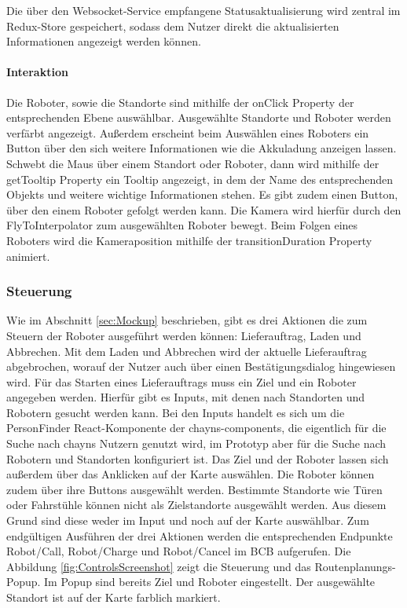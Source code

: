 Die über den \gls{Websocket}-Service empfangene Statusaktualisierung wird zentral im Redux-Store gespeichert, sodass dem Nutzer direkt die aktualisierten Informationen angezeigt werden können.

\paragraph{Interaktion}
Die Roboter, sowie die Standorte sind mithilfe der onClick Property der entsprechenden Ebene \cite{DeckglInteractivity} auswählbar. Ausgewählte Standorte und Roboter werden verfärbt angezeigt. Außerdem erscheint beim Auswählen eines Roboters ein Button über den sich weitere Informationen wie die Akkuladung anzeigen lassen. Schwebt die Maus über einem Standort oder Roboter, dann wird mithilfe der getTooltip Property \cite{DeckglDeckClass} ein Tooltip angezeigt, in dem der Name des entsprechenden Objekts und weitere wichtige Informationen stehen. Es gibt zudem einen Button, über den einem Roboter gefolgt werden kann. Die Kamera wird hierfür durch den FlyToInterpolator \cite{DeckglFlyToInterpolator} zum ausgewählten Roboter bewegt. Beim Folgen eines Roboters wird die Kameraposition mithilfe der transitionDuration Property \cite{DeckglAnimationsAndTransitions} animiert.

\subsubsection{Steuerung}
Wie im Abschnitt \ref{sec:Mockup} beschrieben, gibt es drei Aktionen die zum Steuern der Roboter ausgeführt werden können: Lieferauftrag, Laden und Abbrechen. Mit dem Laden und Abbrechen wird der aktuelle Lieferauftrag abgebrochen, worauf der Nutzer auch über einen Bestätigungsdialog hingewiesen wird. Für das Starten eines Lieferauftrags muss ein Ziel und ein Roboter angegeben werden. Hierfür gibt es Inputs, mit denen nach Standorten und Robotern gesucht werden kann. Bei den Inputs handelt es sich um die PersonFinder React-Komponente \cite{ChaynsPersonFinder} der chayns-components, die eigentlich für die Suche nach chayns Nutzern genutzt wird, im Prototyp aber für die Suche nach Robotern und Standorten konfiguriert ist. Das Ziel und der Roboter lassen sich außerdem über das Anklicken auf der Karte auswählen. Die Roboter können zudem über ihre Buttons ausgewählt werden. Bestimmte Standorte wie Türen oder Fahrstühle können nicht als Zielstandorte ausgewählt werden. Aus diesem Grund sind diese weder im Input und noch auf der Karte auswählbar. Zum endgültigen Ausführen der drei Aktionen werden die entsprechenden Endpunkte Robot/Call, Robot/Charge und Robot/Cancel im \ac{BCB} \cite{BCBSwagger} aufgerufen. Die Abbildung \ref{fig:ControlsScreenshot} zeigt die Steuerung und das Routenplanungs-Popup. Im Popup sind bereits Ziel und Roboter eingestellt. Der ausgewählte Standort ist auf der Karte farblich markiert.

